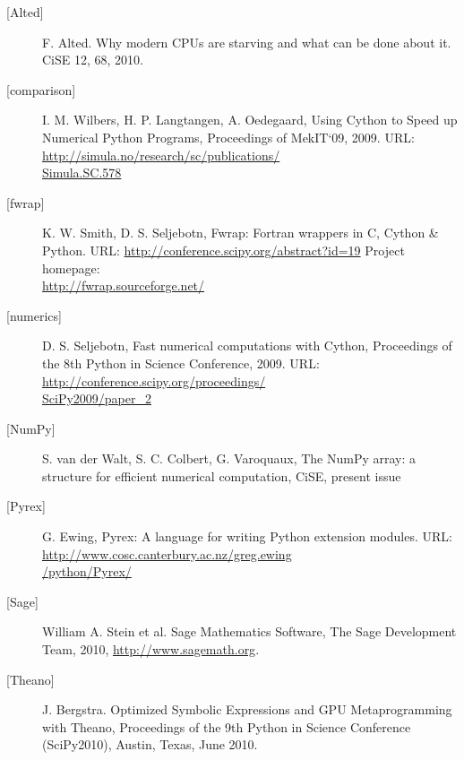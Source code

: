 \documentclass[letterpaper,11pt,english]{article}
\begin{document}
\begin{description}

\item[\hypertarget{alted}{}[Alted{]}]
F. Alted. Why modern CPUs are starving and what can be done about it.
CiSE 12, 68, 2010.

\item[\hypertarget{comparison}{}[comparison{]}]
I. M. Wilbers, H. P. Langtangen, A. Oedegaard,
Using Cython to Speed up Numerical Python Programs,
Proceedings of MekIT`09, 2009. URL:
\href{http://simula.no/research/sc/publications/Simula.SC.578}{http://simula.no/research/sc/publications/\\Simula.SC.578}


\item[\hypertarget{fwrap}{}[fwrap{]}]
K. W. Smith, D. S. Seljebotn, Fwrap: Fortran wrappers in C, Cython
\& Python. URL:
\href{http://conference.scipy.org/abstract?id=19}{http://conference.scipy.org/abstract?id=19}
Project homepage:\\
\href{http://fwrap.sourceforge.net/}{http://fwrap.sourceforge.net/}


\item[\hypertarget{numerics}{}[numerics{]}]
D. S. Seljebotn, Fast numerical computations with
Cython, Proceedings of the 8th Python in Science
Conference, 2009. URL:
\href{http://conference.scipy.org/proceedings/SciPy2009/paper\_2}{http://conference.scipy.org/proceedings/\\SciPy2009/paper\_2}


\item[\hypertarget{numpy}{}[NumPy{]}]
S. van der Walt, S. C. Colbert, G. Varoquaux, The NumPy
array: a structure for efficient numerical computation,
CiSE, present issue


\item[\hypertarget{Pyrex}{}[Pyrex{]}]
G. Ewing, Pyrex: A language for writing Python extension modules.
URL: \href{http://www.cosc.canterbury.ac.nz/greg.ewing/python/Pyrex/}{http://www.cosc.canterbury.ac.nz/greg.ewing\\/python/Pyrex/}


\item[\hypertarget{stein}{}[Sage{]}]
William A. Stein et al. Sage Mathematics Software, The Sage
Development Team, 2010, \href{http://www.sagemath.org}{http://www.sagemath.org}.


\item[\hypertarget{theano}{}[Theano{]}]
J. Bergstra. Optimized Symbolic Expressions and GPU
Metaprogramming with Theano, Proceedings of the 9th Python in
Science Conference (SciPy2010), Austin, Texas, June 2010.



\end{description}
\end{document}
